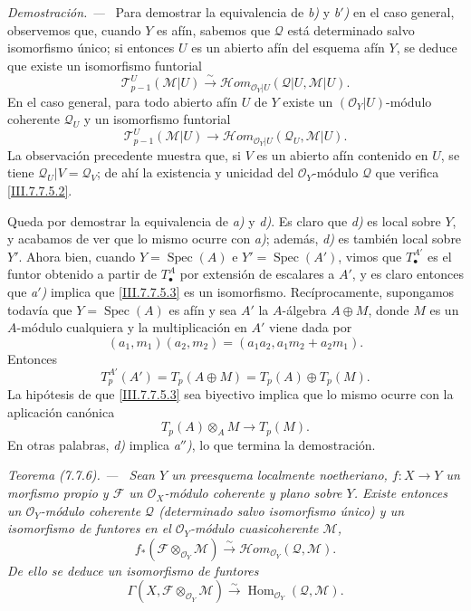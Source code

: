 \documentclass[10pt,oneside]{book}
\newcommand{\oldpage}[2][]{\setcounter{footnote}{0}\marginpar{\scriptsize\textbf{#1}~|~#2}\ignorespaces}
\newenvironment{theorem}[1][]{\par\medskip\noindent\itshape Teorema (#1). ---\ }{\par}
\newenvironment{proof}{\par\medskip\noindent\textit{Demostración. ---\ }}{\par}
\begin{document}
\begin{proof}
Para demostrar la equivalencia de \emph{b)} y \emph{b$'$)} en el caso general, observemos que,
cuando $Y$ es afín, sabemos que $\mathscr Q$ está determinado salvo isomorfismo
único; si entonces $U$ es un abierto afín del esquema afín $Y$, se deduce que
existe un isomorfismo funtorial
\[
  \mathscr T_{p-1}^{U}(\mathscr M|U)
  \xrightarrow{\sim}
  \mathscr{H}\!om_{\mathscr O_Y|U}
    (\mathscr Q|U,\mathscr M|U).
\]
En el caso general, para todo abierto afín $U$ de $Y$ existe un
$(\mathscr O_Y|U)$-módulo coherente $\mathscr Q_U$ y un isomorfismo funtorial
\[
  \mathscr T_{p-1}^{U}(\mathscr M|U)
  \to
  \mathscr{H}\!om_{\mathscr O_Y|U}
    (\mathscr Q_U,\mathscr M|U).
\]
La observación precedente muestra que, si $V$ es un abierto afín contenido en
$U$, se tiene $\mathscr Q_U|V=\mathscr Q_V$; de ahí la existencia y unicidad
del $\mathscr O_Y$-módulo $\mathscr Q$ que verifica \eqref{III.7.7.5.2}.

Queda por demostrar la equivalencia de \emph{a)} y \emph{d)}. Es claro que \emph{d)} es local sobre
$Y$, y acabamos de ver que lo mismo ocurre con \emph{a)}; además, \emph{d)} es también local
sobre $Y'$. Ahora bien, cuando $Y=\operatorname{Spec}(A)$ e
$Y'=\operatorname{Spec}(A')$, vimos que $T_\bullet^{A'}$ es el funtor obtenido
\oldpage[III]{201}
a partir de $T_\bullet^A$ por extensión de escalares a $A'$, y es claro entonces
que \emph{a$'$)} implica que \eqref{III.7.7.5.3} es un isomorfismo.
Recíprocamente, supongamos todavía que $Y=\operatorname{Spec}(A)$ es afín y sea
$A'$ la $A$-álgebra $A\oplus M$, donde $M$ es un $A$-módulo cualquiera y la
multiplicación en $A'$ viene dada por
\[
  (a_1,m_1)(a_2,m_2)
  =
  (a_1a_2,a_1m_2+a_2m_1).
\]
Entonces
\[
  T_p^{A'}(A')
  =
  T_p(A\oplus M)
  =
  T_p(A)\oplus T_p(M).
\]
La hipótesis de que \eqref{III.7.7.5.3} sea biyectivo implica que lo mismo
ocurre con la aplicación canónica
\[
  T_p(A)\otimes_A M\longrightarrow T_p(M).
\]
En otras palabras, \emph{d)} implica \emph{a$''$)}, lo que termina la demostración.
\end{proof}

\begin{theorem}[7.7.6]
\label{III.7.7.6}
Sean $Y$ un preesquema localmente noetheriano, $f:X\to Y$ un morfismo propio y
$\mathscr F$ un $\mathscr O_X$-módulo coherente y plano sobre $Y$. Existe
entonces un $\mathscr O_Y$-módulo coherente $\mathscr Q$ (determinado salvo
isomorfismo único) y un isomorfismo de funtores en el
$\mathscr O_Y$-módulo cuasicoherente $\mathscr M$,
\[
  f_*(\mathscr F\otimes_{\mathscr O_Y}\mathscr M)
  \xrightarrow{\sim}
  \mathscr{H}\!om_{\mathscr O_Y}(\mathscr Q,\mathscr M).
  \tag{7.7.6.1}\label{III.7.7.6.1}
\]
De ello se deduce un isomorfismo de funtores
\[
  \Gamma(X,\mathscr F\otimes_{\mathscr O_Y}\mathscr M)
  \xrightarrow{\sim}
  \operatorname{Hom}_{\mathscr O_Y}(\mathscr Q,\mathscr M).
  \tag{7.7.6.2}\label{III.7.7.6.2}
\]
\end{theorem}
\end{document}
